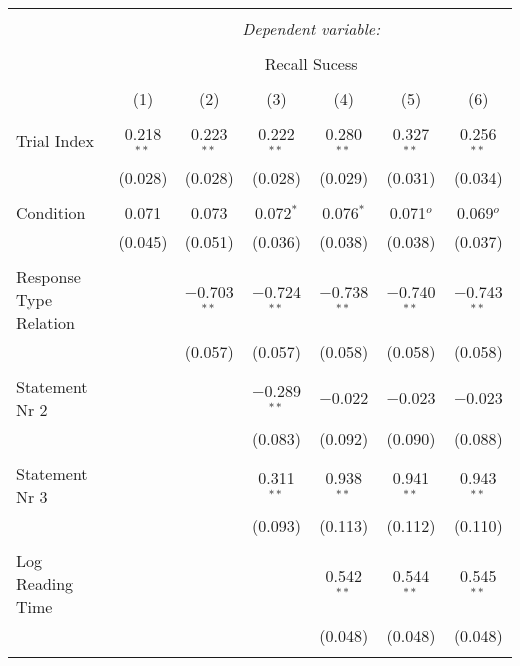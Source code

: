 
\begin{table}
\centering
  \caption{}
  \label{table:main}
\small
\renewcommand{\arraystretch}{0.45}
\begin{tabular}{@{\extracolsep{5pt}}lcccccc}
\\[-1.8ex]\hline
\hline \\[-1.8ex]
 & \multicolumn{6}{c}{\textit{Dependent variable:}} \\
\cline{2-7}
\\[-1.8ex] & \multicolumn{6}{c}{Recall Sucess} \\
\\[-1.8ex] & (1) & (2) & (3) & (4) & (5) & (6)\\
\hline \\[-1.8ex]
 Trial Index & 0.218$^{**}$ & 0.223$^{**}$ & 0.222$^{**}$ & 0.280$^{**}$ & 0.327$^{**}$ & 0.256$^{**}$ \\
  & (0.028) & (0.028) & (0.028) & (0.029) & (0.031) & (0.034) \\
  & & & & & & \\
 Condition & 0.071 & 0.073 & 0.072$^{*}$ & 0.076$^{*}$ & 0.071$^{o}$ & 0.069$^{o}$ \\
  & (0.045) & (0.051) & (0.036) & (0.038) & (0.038) & (0.037) \\
  & & & & & & \\
 Response Type Relation &  & $-$0.703$^{**}$ & $-$0.724$^{**}$ & $-$0.738$^{**}$ & $-$0.740$^{**}$ & $-$0.743$^{**}$ \\
  &  & (0.057) & (0.057) & (0.058) & (0.058) & (0.058) \\
  & & & & & & \\
 Statement Nr 2 &  &  & $-$0.289$^{**}$ & $-$0.022 & $-$0.023 & $-$0.023 \\
  &  &  & (0.083) & (0.092) & (0.090) & (0.088) \\
  & & & & & & \\
 Statement Nr 3 &  &  & 0.311$^{**}$ & 0.938$^{**}$ & 0.941$^{**}$ & 0.943$^{**}$ \\
  &  &  & (0.093) & (0.113) & (0.112) & (0.110) \\
  & & & & & & \\
 Log Reading Time &  &  &  & 0.542$^{**}$ & 0.544$^{**}$ & 0.545$^{**}$ \\
  &  &  &  & (0.048) & (0.048) & (0.048) \\
  & & & & & & \\

\end{tabular}
\end{table}
